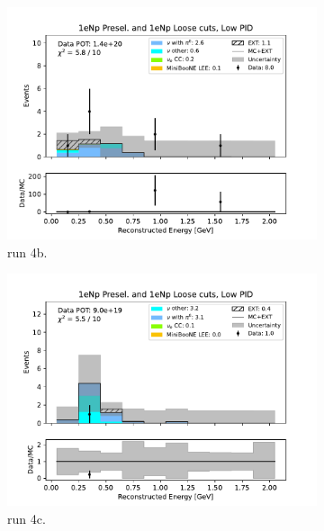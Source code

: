 \begin{figure}
\begin{subfigure}{0.33\linewidth}
        \includegraphics[width=\linewidth]{technote/Sidebands/Figures/FarSideband/far_sideband_reco_e_run4b_NP_NPL_LOW_PID.pdf}
        \caption{run 4b.}
    \end{subfigure}%
    \begin{subfigure}{0.33\linewidth}
        \includegraphics[width=\linewidth]{technote/Sidebands/Figures/FarSideband/far_sideband_reco_e_run4c_NP_NPL_LOW_PID.pdf}
        \caption{run 4c.}
    \end{subfigure}
    \begin{subfigure}{0.33\linewidth}

\end{subfigure}
\end{figure}
